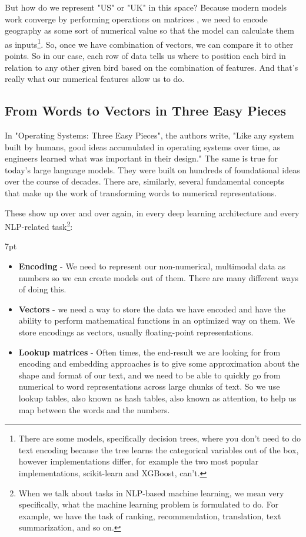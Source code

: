 \documentclass[11pt, table]{diazessay} %
\newenvironment{formal}{%
  \def\FrameCommand{%
    \hspace{1pt}%
    {\color{w_lightblue}\vrule width 2pt}%
    {\color{formalshade}\vrule width 4pt}%
    \colorbox{formalshade}%
  }%
  \MakeFramed{\advance\hsize-\width\FrameRestore}%
  \noindent\hspace{-4.55pt}%
  \begin{adjustwidth}{}{7pt}%
  \vspace{2pt}\vspace{2pt}%
}
{%
  \vspace{2pt}\end{adjustwidth}\endMakeFramed%
}
\begin{document}
\begin{sloppypar}
But how do we represent "US" or "UK" in this space? Because modern models work converge by performing operations on matrices \citep{lakshmanan2020machine}, we need to encode geography as some sort of numerical value so that the model can calculate them as inputs\footnote{There are some models, specifically decision trees, where you don't need to do text encoding because the tree learns the categorical variables out of the box, however implementations differ, for example the two most popular implementations, scikit-learn and XGBoost\citep{altay_2020}, can't.}. So, once we have combination of vectors, we can compare it to other points. So in our case, each row of data tells us where to position each bird in relation to any other given bird based on the combination of features.  And that's really what our numerical features allow us to do. 


\subsection{From Words to Vectors in Three Easy Pieces}
In "Operating Systems: Three Easy Pieces", the authors write, "Like any system built by humans, good ideas accumulated in operating systems over time, as engineers learned what was important in their design."\citep{arpaci2018operating} The same is true for today's large language models. They were built on hundreds of foundational ideas over the course of decades.  There are, similarly, several fundamental concepts that make up the work of transforming words to numerical representations. 

These show up over and over again, in every deep learning architecture and every NLP-related task\footnote{When we talk about tasks in NLP-based machine learning, we mean very specifically, what the machine learning problem is formulated to do. For example, we have the task of ranking, recommendation, translation, text summarization, and so on.}: 

\begin{formal}
\begin{itemize}
  \item \textbf{Encoding} - We need to represent our non-numerical, multimodal data as numbers so we can create models out of them. There are many different ways of doing this. 
  \item \textbf{Vectors} - we need a way to store the data we have encoded and have the ability to perform mathematical functions in an optimized way on them. We store encodings as vectors, usually floating-point representations. 
  \item \textbf{Lookup matrices} - Often times, the end-result we are looking for from encoding and embedding approaches is to give some approximation about the shape and format of our text, and we need to be able to quickly go from numerical to word representations across large chunks of text. So we use lookup tables, also known as hash tables, also known as attention, to help us map between the words and the numbers. 
\end{itemize}
\end{formal}


\end{sloppypar}
\end{document}
